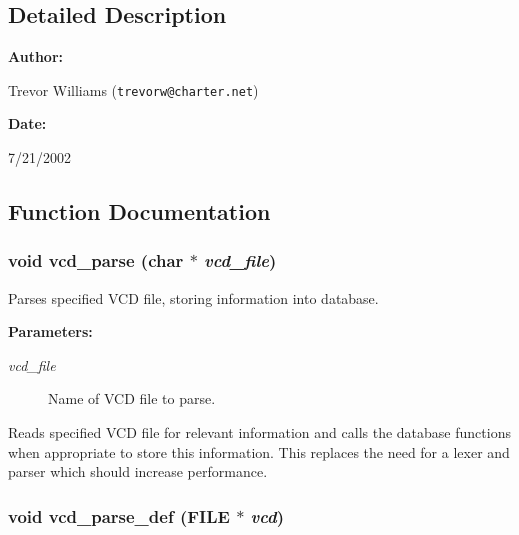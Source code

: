 \subsection{Detailed Description}


\begin{Desc}
\item[{\bf Author: }]\par
Trevor Williams ({\tt trevorw@charter.net}) \end{Desc}
\begin{Desc}
\item[{\bf Date: }]\par
7/21/2002

\end{Desc}


\subsection{Function Documentation}
\subsubsection{\setlength{\rightskip}{0pt plus 5cm}void vcd\_\-parse (char $\ast$ {\em vcd\_\-file})}\label{vcd_8c_a11}


Parses specified VCD file, storing information into database.

\begin{Desc}
\item[{\bf Parameters: }]\par
\begin{description}
\item[
{\em vcd\_\-file}]Name of VCD file to parse.

\end{description}
\end{Desc}
Reads specified VCD file for relevant information and calls the database functions when appropriate to store this information. This replaces the need for a lexer and parser which should increase performance. 
\subsubsection{\setlength{\rightskip}{0pt plus 5cm}void vcd\_\-parse\_\-def (FILE $\ast$ {\em vcd})}\label{vcd_8c_a7}


